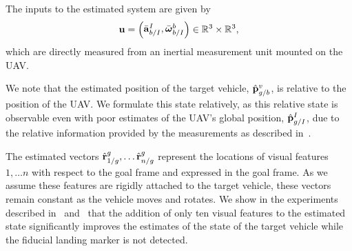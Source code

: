 The inputs to the estimated system are given by
\begin{equation}
  \boldsymbol{\mathrm{u}} = \begin{pmatrix} \bar{\boldsymbol{\mathrm{a}}}_{b/I}^I, \bar{\boldsymbol{\mathrm{\omega}}}_{b/I}^b \end{pmatrix} \in
        \mathbb{R}^3 \times \mathbb{R}^3,
\end{equation}
which are directly measured from an inertial measurement unit mounted on the UAV.


We note that the
estimated position of the target vehicle, $\hat{\boldsymbol{\mathrm{p}}}_{g/b}^v$, is relative to the position of the
UAV.
We formulate this state relatively,
as this relative state is observable even with poor estimates of the UAV's global
position, $\hat{\boldsymbol{\mathrm{p}}}_{g/I}^I$, due to the relative information provided
by the measurements as described in~.

The estimated vectors $\hat{\boldsymbol{\mathrm{r}}}_{1/g}^{g}, \dots \hat{\boldsymbol{\mathrm{r}}}_{n/g}^{g}$ represent the
locations of visual features $1, \dots n$ with respect to the goal frame and
expressed in the goal frame. As we assume these features are rigidly attached to the
target vehicle, these vectors remain constant as the vehicle moves and rotates.
We show in the experiments described in~
and~ that the
addition of only ten visual features to the estimated state significantly
improves the estimates of the state of the target vehicle
while the fiducial landing marker is not detected. 

